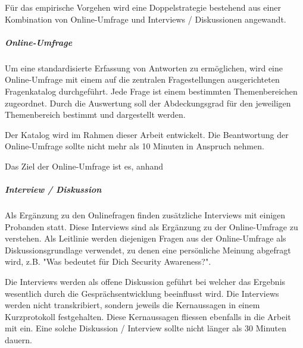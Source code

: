 \documentclass[../../main.tex]{subfiles}
\begin{document}
\begin{sloppypar}
Für das empirische Vorgehen wird eine Doppelstrategie bestehend aus einer Kombination von Online-Umfrage und Interviews / Diskussionen angewandt.
\end{sloppypar}

\subparagraph*{Online-Umfrage}\mbox{}

\begin{sloppypar}
Um eine standardisierte Erfassung von Antworten zu ermöglichen, wird eine Online-Umfrage mit einem auf die zentralen Fragestellungen ausgerichteten Fragenkatalog durchgeführt. Jede Frage ist einem bestimmten Themenbereichen zugeordnet. Durch die Auswertung soll der Abdeckungsgrad für den jeweiligen Themenbereich bestimmt und dargestellt werden.

Der Katalog wird im Rahmen dieser Arbeit entwickelt. Die Beantwortung der Online-Umfrage sollte nicht mehr als 10 Minuten in Anspruch nehmen.

Das Ziel der Online-Umfrage ist es, anhand 
\end{sloppypar}

\subparagraph*{Interview / Diskussion}\mbox{}

\begin{sloppypar}
Als Ergänzung zu den Onlinefragen finden zusätzliche Interviews mit einigen Probanden statt. Diese Interviews sind als Ergänzung zu der Online-Umfrage zu verstehen. Als Leitlinie werden diejenigen Fragen aus der Online-Umfrage als Diskussionsgrundlage verwendet, zu denen eine persönliche Meinung abgefragt wird, z.B. "Was bedeutet für Dich Security Awareness?".

Die Interviews werden als offene Diskussion geführt bei welcher das Ergebnis wesentlich durch die Gesprächsentwicklung beeinflusst wird. Die Interviews werden nicht transkribiert, sondern jeweils die Kernaussagen in einem Kurzprotokoll festgehalten. Diese Kernaussagen fliessen ebenfalls in die Arbeit mit ein. Eine solche Diskussion / Interview sollte nicht länger als 30 Minuten dauern.
\end{sloppypar}
\end{document}
